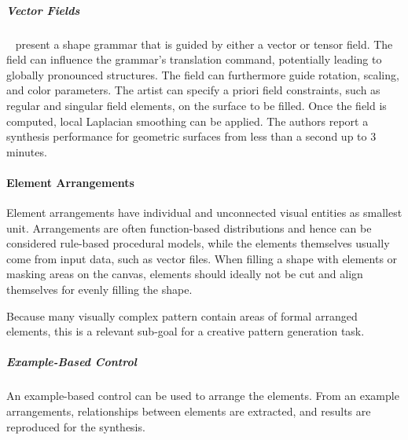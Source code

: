 \subparagraph{Vector Fields}
\label{subpara:analysis_rulebased_vector_fields}

\citeauthor*{yuanyuan_2011_gso}~\cite{yuanyuan_2011_gso} present a shape grammar that is guided by either a vector or tensor field. The field can influence the grammar's translation command, potentially leading to globally pronounced structures. The field can furthermore guide rotation, scaling, and color parameters. The artist can specify a priori field constraints, such as regular and singular field elements, on the surface to be filled. Once the field is computed, local Laplacian smoothing can be applied. The authors report a synthesis performance for geometric surfaces from less than a second up to 3 minutes.




\paragraph{Element Arrangements}
\label{para:analysis_element_arrangements}

Element arrangements have individual and unconnected visual entities as smallest unit. Arrangements are often function-based distributions and hence can be considered rule-based procedural models, while the elements themselves usually come from input data, such as vector files. When filling a shape with elements or masking areas on the canvas, elements should ideally not be cut and align themselves for evenly filling the shape.  

Because many visually complex pattern contain areas of formal arranged elements, this is a relevant sub-goal for a creative pattern generation task.

\subparagraph{Example-Based Control}
\label{subpara:analysis_element_arrangements_example}

An example-based control can be used to arrange the elements. From an example arrangements, relationships between elements are extracted, and results are reproduced for the synthesis. 

